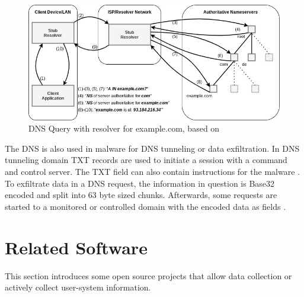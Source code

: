         
        
        
        \begin{figure}
            \centering
            \includegraphics[width=\textwidth]{latex/figures/dns_resolve.jpg}
            \caption[DNS Query with resolver for example.com]{DNS Query with resolver for example.com, based on \cite{friedewald_privacy_2018}}
            \label{fig:dns_query}
        \end{figure}
        
        
        The DNS is also used in malware for DNS tunneling or data exfiltration.
        In DNS tunneling domain TXT records are used to initiate a session with a command and control server. The TXT field can also contain instructions for the malware \cite{das_detection_2017}.\\
        To exfiltrate data in a DNS request, the information in question is Base32 encoded and split into 63 byte sized chunks. Afterwards, some requests are started to a monitored or controlled domain with the encoded data as fields \cite{mertens_infosec_2017}.\\
        
\newpage
\section{Related Software}
    \label{sec:related:related_sw}
    This section introduces some open source projects that allow data collection or actively collect user-system information. 
    
